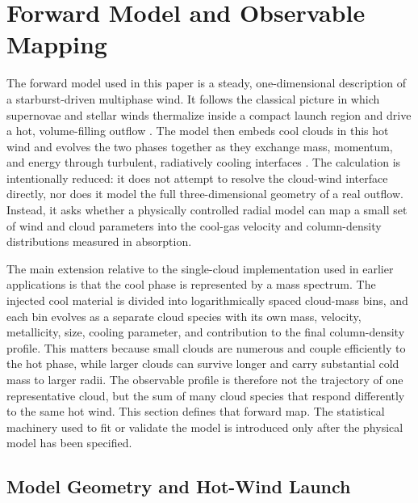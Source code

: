 \section{Forward Model and Observable Mapping}
\label{sec:model}

The forward model used in this paper is a steady, one-dimensional description of a starburst-driven multiphase wind.
It follows the classical picture in which supernovae and stellar winds thermalize inside a compact launch region and drive a hot, volume-filling outflow \citep{Chevalier85}.
The model then embeds cool clouds in this hot wind and evolves the two phases together as they exchange mass, momentum, and energy through turbulent, radiatively cooling interfaces \citep{Fielding22}.
The calculation is intentionally reduced: it does not attempt to resolve the cloud-wind interface directly, nor does it model the full three-dimensional geometry of a real outflow.
Instead, it asks whether a physically controlled radial model can map a small set of wind and cloud parameters into the cool-gas velocity and column-density distributions measured in absorption.

The main extension relative to the single-cloud implementation used in earlier applications is that the cool phase is represented by a mass spectrum.
The injected cool material is divided into logarithmically spaced cloud-mass bins, and each bin evolves as a separate cloud species with its own mass, velocity, metallicity, size, cooling parameter, and contribution to the final column-density profile.
This matters because small clouds are numerous and couple efficiently to the hot phase, while larger clouds can survive longer and carry substantial cold mass to larger radii.
The observable profile is therefore not the trajectory of one representative cloud, but the sum of many cloud species that respond differently to the same hot wind.
This section defines that forward map.
The statistical machinery used to fit or validate the model is introduced only after the physical model has been specified.

\subsection{Model Geometry and Hot-Wind Launch}
\label{subsec:model_launch}

